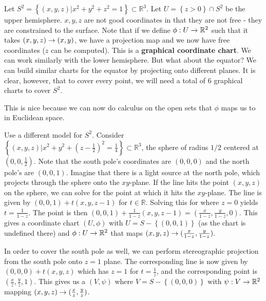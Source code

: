 \documentclass{../mathnotes}
\begin{document}
\begin{exmp}
    Let $S^2=\left\{ (x,y,z) | x^2+y^2+z^2=1 \right\}\subset \mathbb{R}^3$. Let $U=\left\{ z>0 \right\}\cap S^2$ be the upper hemisphere.
    $x, y, z$ are not good coordinates in that they are not free - they are constrained to the surface. Note that if we define $\phi:U\rightarrow\mathbb{R}^2$
    such that it takes $(x,y,z)\rightarrow(x,y)$, we have a projection map and we now have free coordinates ($z$ can be computed). This is a
    \textbf{graphical coordinate chart}. We can work similarly with the lower hemisphere. But what about the equator? We can build similar charts
    for the equator by projecting onto different planes. It is clear, however, that to cover every point, we will need a total of 6 graphical charts to cover $S^2$.

    This is nice because we can now do calculus on the open sets that $\phi$ maps us to in Euclidean space.
\end{exmp}

\begin{exmp}
    Use a different model for $S^2$. Consider $\left\{ (x,y,z) | x^2+y^2+(z-\frac{1}{2})^2=\frac{1}{4} \right\}\subset\mathbb{R}^3$, the sphere of radius $1/2$
    centered at $(0,0,\frac{1}{2})$. Note that the south pole's coordinates are $(0,0,0)$ and the north pole's are $(0,0,1)$. Imagine that there is a light source
    at the north pole, which projects through the sphere onto the $xy$-plane. If the line hits the point $(x,y,z)$ on the sphere, we can solve for the point at
    which it hits the $xy$-plane. The line is given by $(0,0,1)+t(x,y,z-1)$ for $t\in\mathbb{R}$. Solving this for where $z=0$ yields $t=\frac{1}{1-z}$.
    The point is then $(0,0,1)+\frac{1}{1-z}(x,y,z-1)=(\frac{x}{1-z},\frac{y}{1-z},0)$. This gives a coordinate chart $(U,\phi)$ with $U=S-\left\{ (0,0,1) \right\}$
    (as the chart is undefined there) and $\phi:U\rightarrow \mathbb{R}^2$ that maps $(x,y,z)\rightarrow(\frac{x}{1-z},\frac{y}{1-z})$.
    
    In order to cover the south pole as well, we can perform stereographic projection from the south pole onto $z=1$ plane. The corresponding line is now
    given by $(0,0,0)+t(x,y,z)$ which has $z=1$ for $t=\frac{1}{z}$, and the corresponding point is $(\frac{x}{z},\frac{y}{z},1)$. This gives us a $(V,\psi)$
    where $V=S-\left\{ (0,0,0) \right\}$ with $\psi:V\rightarrow\mathbb{R}^2$ mapping $(x,y,z)\rightarrow(\frac{x}{z},\frac{y}{z})$.
\end{exmp}
\end{document}
